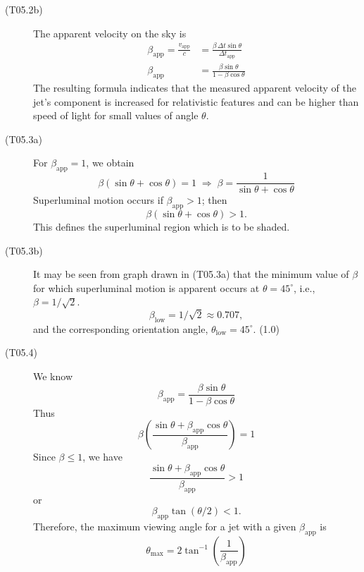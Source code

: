 \begin{description}
\item[(T05.2b)] The apparent velocity on the sky is
  \begin{align*}
  \beta_{\mathrm{app}} = \frac{v_{\mathrm{app}}}{c}
  &= \frac{\beta\,\Delta t \sin\theta}{\Delta t_{\mathrm{app}}} \\
  \beta_{\mathrm{app}}
  &= \frac{\beta\sin\theta}{1 - \beta\cos\theta}
  \tag*{(2.0)}
  \end{align*}
  The resulting formula indicates that the measured apparent velocity of the
  jet's component is increased for relativistic features and can be higher
  than speed of light for small values of angle $\theta$.

\item[(T05.3a)] For $\beta_{\mathrm{app}} = 1$, we obtain
  \[
  \beta(\sin\theta + \cos\theta) = 1
  \;\Longrightarrow\;
  \beta = \frac{1}{\sin\theta + \cos\theta}
  \]
  Superluminal motion occurs if $\beta_{\mathrm{app}} > 1$; then
  \[
  \beta(\sin\theta + \cos\theta) > 1.
  \]
  This defines the superluminal region which is to be shaded.

\item[(T05.3b)] It may be seen from graph drawn in (T05.3a) that the minimum
  value of $\beta$ for which superluminal motion is apparent occurs at
  $\theta = 45^\circ$, i.e., $\beta = 1/\sqrt{2}$.
  \begin{equation*}
  \beta_{\mathrm{low}} = 1/\sqrt{2} \approx 0.707,
  \tag*{(1.0)}
  \end{equation*}
  and the corresponding orientation angle,
  $\theta_{\mathrm{low}} = 45^\circ$. \hfill(1.0)

\item[(T05.4)] We know
  \[
  \beta_{\mathrm{app}} = \frac{\beta\sin\theta}{1 - \beta\cos\theta}
  \]
  Thus
  \[
  \beta\left(\frac{\sin\theta + \beta_{\mathrm{app}}\cos\theta}
                  {\beta_{\mathrm{app}}}\right) = 1
  \]
  Since $\beta \le 1$, we have
  \begin{equation*}
  \frac{\sin\theta + \beta_{\mathrm{app}}\cos\theta}{\beta_{\mathrm{app}}} > 1
  \tag*{(1.0)}
  \end{equation*}
  or
  \[
  \beta_{\mathrm{app}} \tan(\theta/2) < 1.
  \]
  Therefore, the maximum viewing angle for a jet with a given
  $\beta_{\mathrm{app}}$ is
  \begin{equation*}
  \theta_{\mathrm{max}}
  = 2\tan^{-1}\!\left(\frac{1}{\beta_{\mathrm{app}}}\right)
  \tag*{(1.0)}
  \end{equation*}


\end{description}
